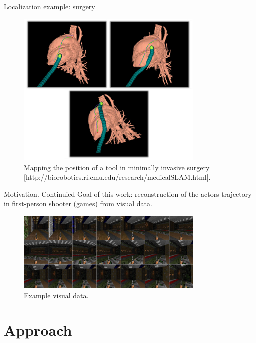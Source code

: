 \documentclass[pdftex, handout]{beamer}
\begin{document}
\begin{frame}[noframenumbering]{Localization example: surgery}
  \begin{figure}
  \includegraphics[width=0.8\textwidth,height=0.7\textheight,keepaspectratio]{images/slam_surg.jpg}
\caption{Mapping the position of a tool in minimally invasive surgery [http://biorobotics.ri.cmu.edu/research/medicalSLAM.html].}
\end{figure}

\end{frame}

\begin{frame}{Motivation. Continuied}
  Goal of this work: reconstruction of the actors trajectory in first-person shooter (games) from visual data.

  \pause

  \begin{figure}
    \includegraphics[width=0.8\textwidth,height=0.7\textheight,keepaspectratio]{images_main/sprite2.png}
  \caption{Example visual data.}
  \end{figure}
\end{frame}


\section{Approach}
\end{document}
